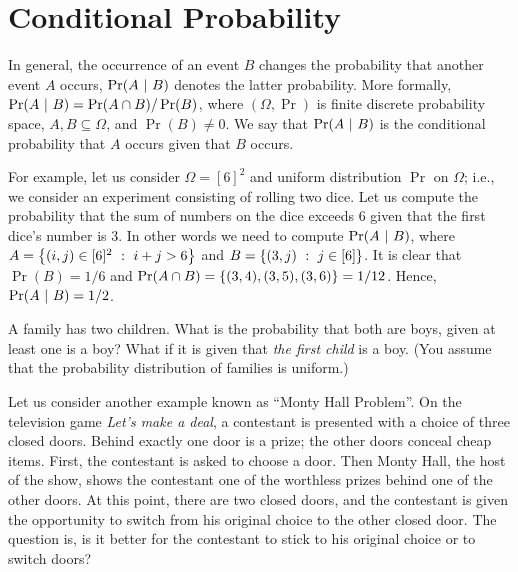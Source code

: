 \chapter{Conditional Probability}
In general, the occurrence of an event $B$ changes the probability that another
event $A$ occurs, $\Pr(A ~\rvert~ B)$ denotes the latter probability. More
formally, $\Pr(A ~\rvert~ B) = \Pr(A \cap B) / \Pr(B)$, where $(\Omega, \Pr)$ is
finite discrete probability space, $A, B \subseteq \Omega$, and $\Pr(B) \neq 0$. 
We say that $\Pr(A ~\rvert~ B)$ is the conditional probability that $A$ occurs
given that $B$ occurs.

For example, let us consider $\Omega = [6]^2$ and uniform distribution $\Pr$ on
$\Omega$; i.e., we consider an experiment consisting of rolling two dice. Let
us compute the probability that the sum of numbers on the dice exceeds $6$
given that the first dice's number is $3$. In other words we need to compute
$\Pr(A ~\rvert~ B)$, where $A = \set[i + j > 6]{(i, j) \in [6]^2}$ and 
$B = \set[{j \in [6]}]{(3, j)}$. It is clear that $\Pr(B) = 1 / 6$ and 
$\Pr(A \cap B) = \set{(3, 4), (3, 5), (3, 6)} = 1 / 12$. Hence, $\Pr(A ~\rvert~ B)
= 1 / 2$.

\begin{exercise}
  A family has two children. What is the probability that both are boys, given
  at least one is a boy? What if it is given that \emph{the first child} is a
  boy. (You assume that the probability distribution of families is uniform.)
\end{exercise}

Let us consider another example known as ``Monty Hall Problem''. On the
television game \emph{Let’s make a deal}, a contestant is presented with a
choice of three closed doors. Behind exactly one door is a prize; the other
doors conceal cheap items. First, the contestant is asked to choose a door. Then
Monty Hall, the host of the show,  shows the contestant one of the worthless
prizes behind one of the other doors. At this point, there are two closed
doors, and the contestant is given the opportunity to switch from his original
choice to the other closed door. The question is, is it better for the
contestant to stick to his original choice or to switch doors?



